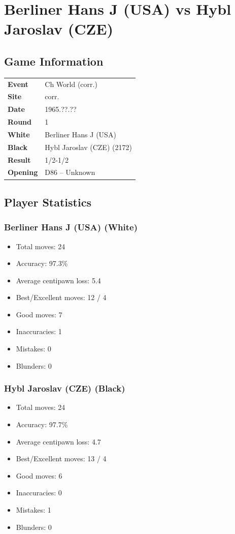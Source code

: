 \documentclass[11pt]{book}
\begin{document}
\chapter{Berliner Hans J (USA) vs Hybl Jaroslav (CZE)}

\section{Game Information}
\begin{tabular}{ll}
\textbf{Event} & Ch World (corr.) \\
\textbf{Site} & corr. \\
\textbf{Date} & 1965.??.?? \\
\textbf{Round} & 1 \\
\textbf{White} & Berliner Hans J (USA) \\
\textbf{Black} & Hybl Jaroslav (CZE) (2172) \\
\textbf{Result} & 1/2-1/2 \\
\textbf{Opening} & D86 -- Unknown \\
\end{tabular}

\section{Player Statistics}

\subsection{Berliner Hans J (USA) (White)}
\begin{itemize}
\item Total moves: 24
\item Accuracy: 97.3\%
\item Average centipawn loss: 5.4
\item Best/Excellent moves: 12 / 4
\item Good moves: 7
\item Inaccuracies: 1
\item Mistakes: 0
\item Blunders: 0
\end{itemize}

\subsection{Hybl Jaroslav (CZE) (Black)}
\begin{itemize}
\item Total moves: 24
\item Accuracy: 97.7\%
\item Average centipawn loss: 4.7
\item Best/Excellent moves: 13 / 4
\item Good moves: 6
\item Inaccuracies: 0
\item Mistakes: 1
\item Blunders: 0
\end{itemize}
\end{document}
